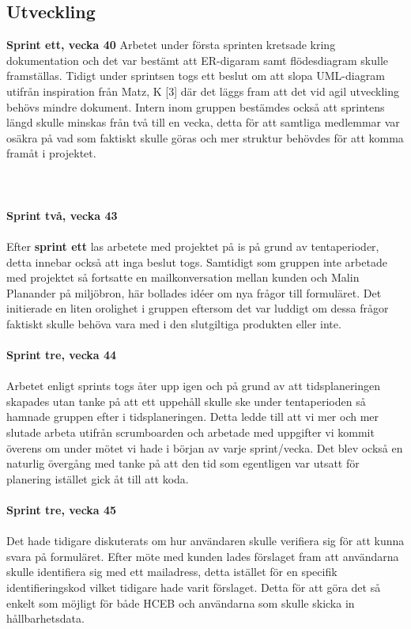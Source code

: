 \documentclass[12pt]{article}
\begin{document}
\subsection{Utveckling}
\textbf{Sprint ett, vecka 40}
Arbetet under första sprinten kretsade kring dokumentation och det var bestämt att ER-digaram samt flödesdiagram skulle framställas. Tidigt under sprintsen togs ett beslut om att slopa UML-diagram utifrån inspiration från Matz, K [3] där det läggs fram att det vid agil utveckling behövs mindre dokument. 
Intern inom gruppen bestämdes också att sprintens längd skulle minskas från två till en vecka, detta för att samtliga medlemmar var osäkra på vad som faktiskt skulle göras och mer struktur behövdes för att komma framåt i projektet. \\\\
\\\\\textbf{Sprint två, vecka 43}\\\\
Efter \textbf{sprint ett} las arbetete med projektet på is på grund av tentaperioder, detta innebar också att inga beslut togs. Samtidigt som gruppen inte arbetade med projektet så fortsatte en mailkonversation mellan kunden och Malin Planander på miljöbron, här bollades idéer om nya frågor till formuläret. Det initierade en liten orolighet i gruppen eftersom det var luddigt om dessa frågor faktiskt skulle behöva vara med i den slutgiltiga produkten eller inte.\\\\
\textbf{Sprint tre, vecka 44}\\\\
Arbetet enligt sprints togs åter upp igen och på grund av att tidsplaneringen skapades utan tanke på att ett uppehåll skulle ske under tentaperioden så hamnade gruppen efter i tidsplaneringen. Detta ledde till att vi mer och mer slutade arbeta utifrån scrumboarden och arbetade med uppgifter vi kommit överens om under mötet vi hade i början av varje sprint/vecka. Det blev också en naturlig övergång med tanke på att den tid som egentligen var utsatt för planering istället gick åt till att koda. \\\\
\textbf{Sprint tre, vecka 45} \\\\
Det hade tidigare diskuterats om hur användaren skulle verifiera sig för att kunna svara på formuläret. Efter möte med kunden lades förslaget fram att användarna skulle identifiera sig med ett mailadress, detta istället för en specifik identifieringskod vilket tidigare hade varit förslaget. Detta för att göra det så enkelt som möjligt för både HCEB och användarna som skulle skicka in hållbarhetsdata.\\
\end{document}
